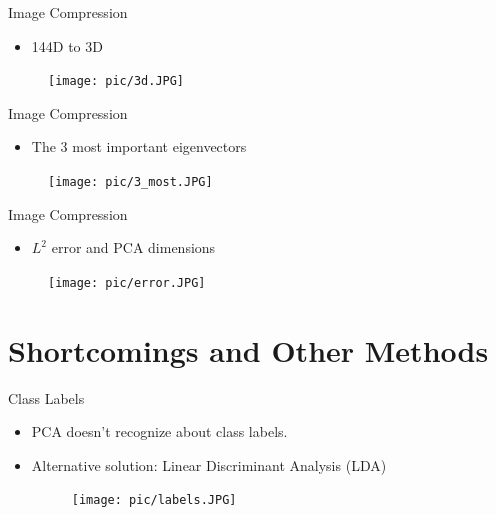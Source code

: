 \documentclass[serif, aspectratio=169]{beamer}
\begin{document}
\begin{frame}{Image Compression}
       \begin{itemize}
           \item 144D to 3D
       \end{itemize}
        \begin{figure}[htpb]
            \begin{center}
                \texttt{[image: pic/3d.JPG]}
            \end{center}
        \end{figure}
\end{frame}


\begin{frame}{Image Compression}
       \begin{itemize}
           \item The 3 most important eigenvectors
       \end{itemize}
        \begin{figure}[htpb]
            \begin{center}
                \texttt{[image: pic/3\_most.JPG]}
            \end{center}
        \end{figure}
\end{frame}


\begin{frame}{Image Compression}
       \begin{itemize}
           \item $L^2$ error and PCA dimensions
       \end{itemize}
        \begin{figure}[htpb]
            \begin{center}
                \texttt{[image: pic/error.JPG]}
            \end{center}
        \end{figure}
\end{frame}

\section{Shortcomings and Other Methods}

\begin{frame}{Class Labels}
    \begin{itemize}
        \item PCA doesn’t recognize about class labels.
        \item Alternative solution: Linear Discriminant Analysis (LDA)
        \begin{figure}[htpb]
            \begin{center}
                \texttt{[image: pic/labels.JPG]}
            \end{center}
        \end{figure}
    \end{itemize}
\end{frame}
\end{document}
